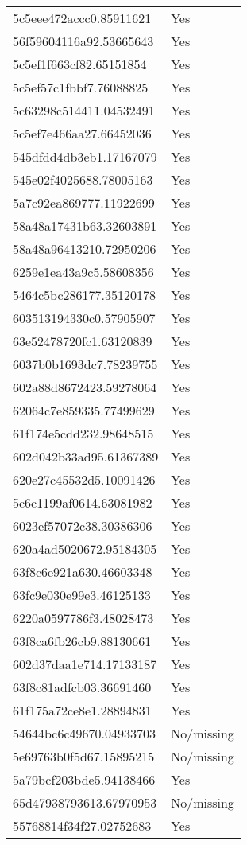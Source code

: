 \begin{tabular}{ll}
5c5eee472accc0.85911621 & Yes \\
56f59604116a92.53665643 & Yes \\
5c5ef1f663cf82.65151854 & Yes \\
5c5ef57c1fbbf7.76088825 & Yes \\
5c63298c514411.04532491 & Yes \\
5c5ef7e466aa27.66452036 & Yes \\
545dfdd4db3eb1.17167079 & Yes \\
545e02f4025688.78005163 & Yes \\
5a7c92ea869777.11922699 & Yes \\
58a48a17431b63.32603891 & Yes \\
58a48a96413210.72950206 & Yes \\
6259e1ea43a9c5.58608356 & Yes \\
5464c5bc286177.35120178 & Yes \\
603513194330c0.57905907 & Yes \\
63e52478720fc1.63120839 & Yes \\
6037b0b1693dc7.78239755 & Yes \\
602a88d8672423.59278064 & Yes \\
62064c7e859335.77499629 & Yes \\
61f174e5cdd232.98648515 & Yes \\
602d042b33ad95.61367389 & Yes \\
620e27c45532d5.10091426 & Yes \\
5c6c1199af0614.63081982 & Yes \\
6023ef57072c38.30386306 & Yes \\
620a4ad5020672.95184305 & Yes \\
63f8c6e921a630.46603348 & Yes \\
63fc9e030e99e3.46125133 & Yes \\
6220a0597786f3.48028473 & Yes \\
63f8ca6fb26cb9.88130661 & Yes \\
602d37daa1e714.17133187 & Yes \\
63f8c81adfcb03.36691460 & Yes \\
61f175a72ce8e1.28894831 & Yes \\
54644bc6c49670.04933703 & No/missing \\
5e69763b0f5d67.15895215 & No/missing \\
5a79bcf203bde5.94138466 & Yes \\
65d47938793613.67970953 & No/missing \\
55768814f34f27.02752683 & Yes \\

\end{tabular}
